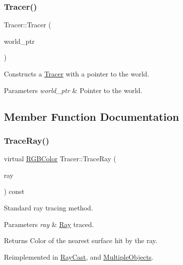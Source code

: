 \subsubsection{\texorpdfstring{Tracer()}{Tracer()}}
{\footnotesize\ttfamily Tracer\+::\+Tracer (\begin{DoxyParamCaption}\item[{std\+::shared\+\_\+ptr$<$ World $>$}]{world\+\_\+ptr }\end{DoxyParamCaption})}

Constructs a \hyperlink{class_tracer}{Tracer} with a pointer to the world. 
\begin{DoxyParams}{Parameters}
{\em world\+\_\+ptr} & Pointer to the world. \\
\hline
\end{DoxyParams}


\subsection{Member Function Documentation}
\hypertarget{class_tracer_adbabdfde11e278945a0433d08445fcce}{}\label{class_tracer_adbabdfde11e278945a0433d08445fcce} 
\subsubsection{\texorpdfstring{Trace\+Ray()}{TraceRay()}}
{\footnotesize\ttfamily virtual \hyperlink{class_r_g_b_color}{R\+G\+B\+Color} Tracer\+::\+Trace\+Ray (\begin{DoxyParamCaption}\item[{const \hyperlink{class_ray}{Ray} \&}]{ray }\end{DoxyParamCaption}) const\hspace{0.3cm}{\ttfamily [virtual]}}

Standard ray tracing method. 
\begin{DoxyParams}{Parameters}
{\em ray} & \hyperlink{class_ray}{Ray} traced. \\
\hline
\end{DoxyParams}
\begin{DoxyReturn}{Returns}
Color of the nearest surface hit by the ray. 
\end{DoxyReturn}


Reimplemented in \hyperlink{class_ray_cast_aed24a822899e5328a7e668a479d3be9e}{Ray\+Cast}, and \hyperlink{class_multiple_objects_a46206cc6dd09a9c587e33ac896bc8e3a}{Multiple\+Objects}.



